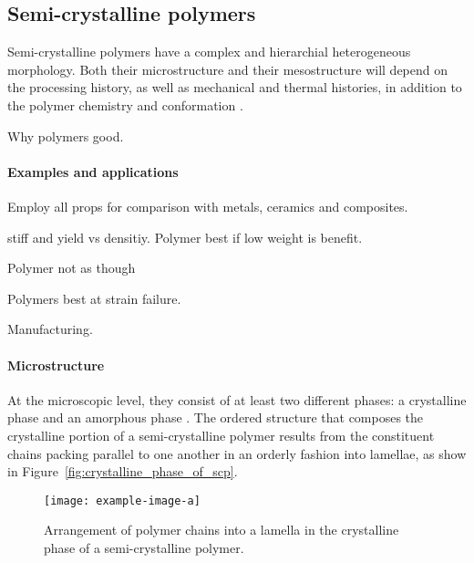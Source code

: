 \subsection{Semi-crystalline polymers}

Semi-crystalline polymers have a complex and hierarchial heterogeneous morphology.
Both their microstructure and their mesostructure will depend on the processing history, as well as mechanical and thermal histories, in addition to the polymer chemistry and conformation \citep{khouryMorphologyCrystallineSynthetic1976,cangemiTwoPhaseModelMechanical2001,hoffmanAnalysisRelaxationsPolychlorotrifluoroethylene2007}.

Why polymers good.

\paragraph{Examples and applications}

Employ all props for comparison with metals, ceramics and composites.

stiff and yield vs densitiy. Polymer best if low weight is benefit.

Polymer not as though

Polymers best at strain failure.

 Manufacturing.

\paragraph{Microstructure}
At the microscopic level, they consist of at least two different phases: a crystalline phase and an amorphous phase \citep{khouryMorphologyCrystallineSynthetic1976}.
The ordered structure that composes the crystalline portion of a semi-crystalline polymer results from the constituent chains packing parallel to one another in an orderly fashion into lamellae, as show in Figure~\eqref{fig:crystalline_phase_of_scp}.

\begin{figure}[htbp]
	\texttt{[image: example-image-a]}
	\caption{Arrangement of polymer chains into a lamella in the crystalline phase of a semi-crystalline polymer.}
\label{fig:crystalline_phase_of_scp}
\end{figure}

